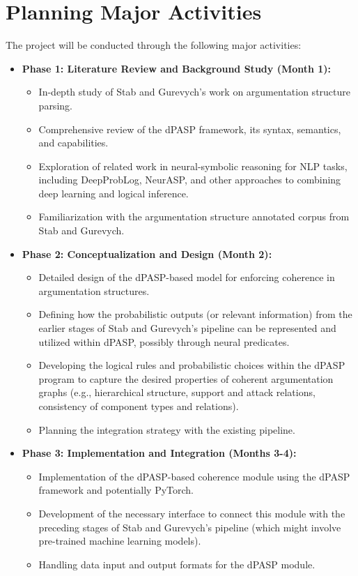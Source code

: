 \documentclass{article}
\begin{document}
\section{Planning Major Activities}

The project will be conducted through the following major activities:

\begin{itemize}
    \item \textbf{Phase 1: Literature Review and Background Study (Month 1):}
    \begin{itemize}
        \item In-depth study of Stab and Gurevych's work on argumentation
        structure parsing.
        \item Comprehensive review of the dPASP framework, its syntax,
        semantics, and capabilities.
        \item Exploration of related work in neural-symbolic reasoning for NLP
        tasks, including DeepProbLog, NeurASP, and other approaches to combining
        deep learning and logical inference.
        \item Familiarization with the argumentation structure annotated corpus
        from Stab and Gurevych.
    \end{itemize}

    \item \textbf{Phase 2: Conceptualization and Design (Month 2):}
    \begin{itemize}
        \item Detailed design of the dPASP-based model for enforcing coherence
        in argumentation structures.
        \item Defining how the probabilistic outputs (or relevant information)
        from the earlier stages of Stab and Gurevych's pipeline can be
        represented and utilized within dPASP, possibly through neural
        predicates.
        \item Developing the logical rules and probabilistic choices within the
        dPASP program to capture the desired properties of coherent
        argumentation graphs (e.g., hierarchical structure, support and attack
        relations, consistency of component types and relations).
        \item Planning the integration strategy with the existing pipeline.
    \end{itemize}

    \item \textbf{Phase 3: Implementation and Integration (Months 3-4):}
    \begin{itemize}
        \item Implementation of the dPASP-based coherence module using the dPASP
        framework and potentially PyTorch.
        \item Development of the necessary interface to connect this module with
        the preceding stages of Stab and Gurevych's pipeline (which might
        involve pre-trained machine learning models).
        \item Handling data input and output formats for the dPASP module.
    \end{itemize}


\end{itemize}
\end{document}
